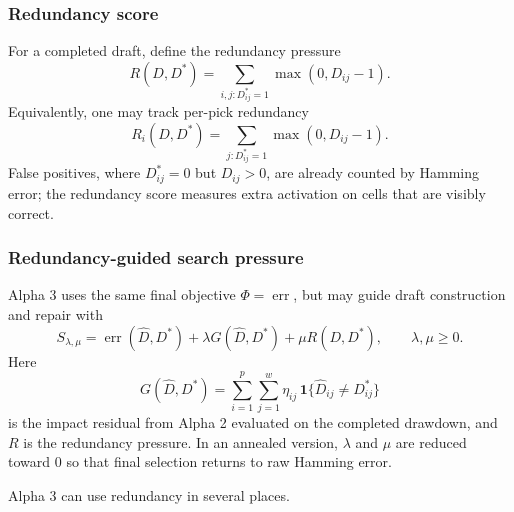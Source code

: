 \documentclass[11pt]{article}
\begin{document}
\subsubsection*{Redundancy score}

For a completed draft, define the redundancy pressure
\[
  R(D,D^\ast)
  =
  \sum_{i,j:D^\ast_{ij}=1}\max(0,D_{ij}-1).
\]
Equivalently, one may track per-pick redundancy
\[
  R_i(D,D^\ast)
  =
  \sum_{j:D^\ast_{ij}=1}\max(0,D_{ij}-1).
\]
False positives, where \(D^\ast_{ij}=0\) but \(D_{ij}>0\), are already counted
by Hamming error; the redundancy score measures extra activation on cells that
are visibly correct.

\subsubsection*{Redundancy-guided search pressure}

Alpha 3 uses the same final objective \(\Phi=\operatorname{err}\), but may
guide draft construction and repair with
\[
  S_{\lambda,\mu}
  =
  \operatorname{err}(\widehat{D},D^\ast)
  +
  \lambda G(\widehat{D},D^\ast)
  +
  \mu R(D,D^\ast),
  \qquad
  \lambda,\mu\ge 0.
\]
Here
\[
  G(\widehat{D},D^\ast)
  =
  \sum_{i=1}^{p}
  \sum_{j=1}^{w}
  \eta_{ij}\,
  \mathbf{1}\{\widehat{D}_{ij}\ne D^\ast_{ij}\}
\]
is the impact residual from Alpha 2 evaluated on the completed drawdown, and
\(R\) is the redundancy pressure. In an annealed version, \(\lambda\) and
\(\mu\) are reduced toward \(0\) so that final selection returns to raw Hamming
error.

Alpha 3 can use redundancy in several places.
\end{document}
